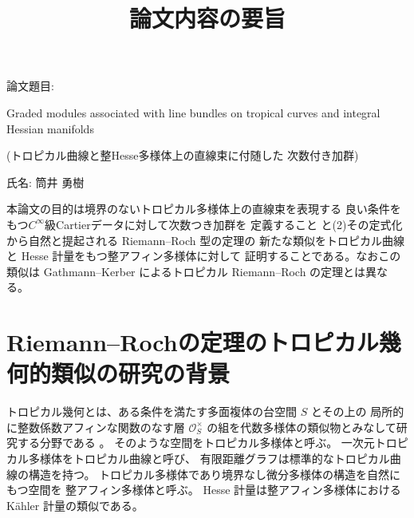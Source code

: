 \documentclass[uplatex,dvipdfmx,12pt]{jsarticle}
\title{論文内容の要旨
}
\date{}
\numberwithin{equation}{section}
\theoremstyle{definition}
\newcommand{\beforesection}{\vspace{-15pt}}
\newcommand{\aftersection}{\vspace{-8pt}}
\begin{document}
\setlength{\baselineskip}{-5pt}
\setlength{\parskip}{2pt}


\maketitle
{\large
\noindent
論文題目:

Graded modules associated with line bundles on 
tropical curves and integral Hessian manifolds

(トロピカル曲線と整Hesse多様体上の直線束に付随した
次数付き加群)
}

\vspace{5pt}

\noindent
{\large
氏名: 筒井 勇樹
}

\vspace{10pt}

\setlength{\baselineskip}{4pt}
\setlength{\parskip}{2pt}

本論文の目的は境界のないトロピカル多様体上の直線束を表現する
良い条件をもつ$C^{\infty}$級Cartierデータに対して次数つき加群を
定義すること
と(2)その定式化から自然と提起される Riemann--Roch 型の定理の
新たな類似をトロピカル曲線と Hesse 計量をもつ整アフィン多様体に対して
証明することである。なおこの類似は Gathmann--Kerber
によるトロピカル Riemann--Roch の定理とは異なる。

\beforesection

\section{Riemann--Rochの定理のトロピカル幾何的類似の研究の背景}

\aftersection

トロピカル幾何とは、ある条件を満たす多面複体の台空間 $S$ とその上の
局所的に整数係数アフィンな関数のなす層 
$\mathcal{O}_S^{\times}$
の組を代数多様体の類似物とみなして研究する分野である
\cite{mikhalkinTropicalEigenwaveIntermediate2014a,
gross2019sheaftheoretic}。
そのような空間をトロピカル多様体と呼ぶ。
一次元トロピカル多様体をトロピカル曲線と呼び、
有限距離グラフは標準的なトロピカル曲線の構造を持つ。
トロピカル多様体であり境界なし微分多様体の構造を自然にもつ空間を
整アフィン多様体と呼ぶ。
Hesse 計量は整アフィン多様体における
K\"ahler 計量の類似である。
\end{document}
